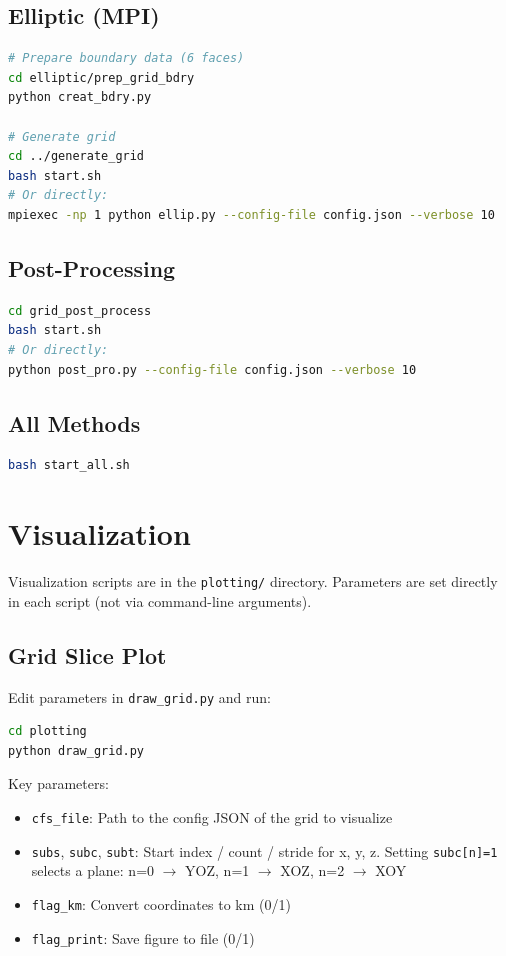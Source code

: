 \documentclass[11pt,a4paper]{report}
\begin{document}
\subsection{Elliptic (MPI)}
\begin{lstlisting}[language=bash]
# Prepare boundary data (6 faces)
cd elliptic/prep_grid_bdry
python creat_bdry.py

# Generate grid
cd ../generate_grid
bash start.sh
# Or directly:
mpiexec -np 1 python ellip.py --config-file config.json --verbose 10
\end{lstlisting}

\subsection{Post-Processing}
\begin{lstlisting}[language=bash]
cd grid_post_process
bash start.sh
# Or directly:
python post_pro.py --config-file config.json --verbose 10
\end{lstlisting}

\subsection{All Methods}
\begin{lstlisting}[language=bash]
bash start_all.sh
\end{lstlisting}

\section{Visualization}

Visualization scripts are in the \texttt{plotting/} directory. Parameters are set directly in each script (not via command-line arguments).

\subsection{Grid Slice Plot}

Edit parameters in \texttt{draw\_grid.py} and run:
\begin{lstlisting}[language=bash]
cd plotting
python draw_grid.py
\end{lstlisting}

Key parameters:
\begin{itemize}
    \item \texttt{cfs\_file}: Path to the config JSON of the grid to visualize
    \item \texttt{subs}, \texttt{subc}, \texttt{subt}: Start index / count / stride for x, y, z. Setting \texttt{subc[n]=1} selects a plane: n=0 $\to$ YOZ, n=1 $\to$ XOZ, n=2 $\to$ XOY
    \item \texttt{flag\_km}: Convert coordinates to km (0/1)
    \item \texttt{flag\_print}: Save figure to file (0/1)
\end{itemize}
\end{document}
